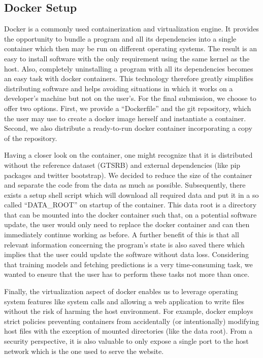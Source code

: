 \subsection{Docker Setup}\label{subsec:docker}
Docker is a commonly used containerization and virtualization engine.
It provides the opportunity to bundle a program and all its dependencies into a single container which then may be run on different operating systems.
The result is an easy to install software with the only requirement using the same kernel as the host.
Also, completely uninstalling a program with all its dependencies becomes an easy task with docker containers.
This technology therefore greatly simplifies distributing software and helps avoiding situations in which it works on a developer's machine but not on the user's.
For the final submission, we choose to offer two options.
First, we provide a \enquote{Dockerfile} and the git repository, which the user may use to create a docker image herself and instantiate a container.
Second, we also distribute a ready-to-run docker container incorporating a copy of the repository.

Having a closer look on the container, one might recognize that it is distributed without the reference dataset (GTSRB) and external dependencies (like pip packages and twitter bootstrap).
We decided to reduce the size of the container and separate the code from the data as much as possible.
Subsequently, there exists a setup shell script which will download all required data and put it in a so called \enquote{DATA\_ROOT} on startup of the container.
This data root is a directory that can be mounted into the docker container such that, on a potential software update, the user would only need to replace the docker container and can then immediately continue working as before.
A further benefit of this is that all relevant information concerning the program's state is also saved there which implies that the user could update the software without data loss.
Considering that training models and fetching predictions is a very time-consuming task, we wanted to ensure that the user has to perform these tasks not more than once.

Finally, the virtualization aspect of docker enables us to leverage operating system features like system calls and allowing a web application to write files without the risk of harming the host environment.
For example, docker employs strict policies preventing containers from accidentally (or intentionally) modifying host files with the exception of mounted directories (like the data root).
From a security perspective, it is also valuable to only expose a single port to the host network which is the one used to serve the website.
